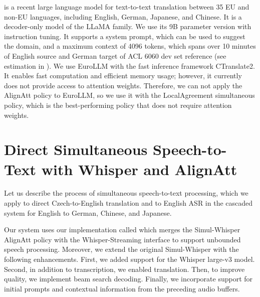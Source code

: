 \documentclass[11pt]{article}
\def\XXX#1{} %
\begin{document}

 \cite{eurollm} is a recent large language model for text-to-text translation between 35 EU and non-EU languages, including English, German, Japanese, and Chinese. It is a decoder-only model of the LLaMA family. We use its 9B parameter version with instruction tuning. It supports a system prompt, which can be used to suggest the domain, and a maximum context of 4096 tokens, which spans over 10 minutes of English source and German target of ACL 6060 \cite{acl6060} dev set reference (see estimation in ). We use EuroLLM with the fast inference framework CTranslate2. It enables fast computation and efficient memory usage; however, it currently does not provide access to attention weights. Therefore, we can not apply the AlignAtt policy to EuroLLM, so we use it with the LocalAgreement simultaneous policy, %
which is the best-performing policy that does not require attention weights. 





\section{Direct Simultaneous Speech-to-Text with Whisper and AlignAtt}

Let us describe the process of simultaneous speech-to-text processing, which we apply to direct Czech-to-English translation and to English ASR in the cascaded system for English to German, Chinese, and Japanese.

Our system uses our implementation called \SimulStreaming{} which merges the Simul-Whisper AlignAtt policy with the Whisper-Streaming interface to support unbounded speech processing. Moreover, we extend the original Simul-Whisper with the following enhancements. First, we added support for the Whisper large-v3 model. Second, in addition to transcription, we enabled translation. Then, to improve quality, we implement beam search decoding. Finally, we incorporate support for initial prompts and contextual information from the preceding audio buffers. %

\def\MinChunkSize{\textit{MinChunkSize}}
\def\BufferLen{\textit{BufferLength}}
\def\MaxContextLen{\textit{MaxContextLength}}
\def\StaticPrompt{\textit{StaticPrompt}}
\def\Frames{\textit{Frames}}
\def\Beams{\textit{Beams}}
\def\NonStaticPrompt{\textit{NonStaticPrompt}}
\def\Prompt{\textit{Prompt}}
\end{document}
